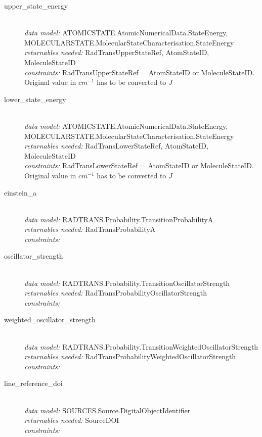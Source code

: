 \documentclass[11pt,a4paper]{ivoa}
\begin{document}
\begin{description}
	\item [upper\_state\_energy]\hfill\\
	\textit{data model:} ATOMICSTATE.AtomicNumericalData.StateEnergy, \\ 
MOLECULARSTATE.MolecularStateCharacterisation.StateEnergy\\
	\textit{returnables needed:} RadTransUpperStateRef, AtomStateID, 
MoleculeStateID\\
	\textit{constraints:} 
 RadTransUpperStateRef = AtomStateID or MoleculeStateID. 
 Original value in $cm^{-1}$ has to be converted to $J$
	
	\item [lower\_state\_energy]\hfill\\
	\textit{data model:} ATOMICSTATE.AtomicNumericalData.StateEnergy, \\ 
MOLECULARSTATE.MolecularStateCharacterisation.StateEnergy\\
	\textit{returnables needed:} RadTransLowerStateRef, AtomStateID,  
MoleculeStateID\\
	\textit{constraints:}  RadTransLowerStateRef = AtomStateID or MoleculeStateID.
	Original value in $cm^{-1}$ has to be converted to $J$

	\item [einstein\_a]\hfill\\
	\textit{data model:}  RADTRANS.Probability.TransitionProbabilityA\\
	\textit{returnables needed:} RadTransProbabilityA\\
	\textit{constraints:}

	\item [oscillator\_strength]\hfill\\
	\textit{data model:}  RADTRANS.Probability.TransitionOscillatorStrength\\
	\textit{returnables needed:} RadTransProbabilityOscillatorStrength\\
        \textit{constraints:}

	\item [weighted\_oscillator\_strength]\hfill\\
	\textit{data model:}  RADTRANS.Probability.TransitionWeightedOscillatorStrength\\
	\textit{returnables needed:} RadTransProbabilityWeightedOscillatorStrength\\
 	   \textit{constraints:}

	\item [line\_reference\_doi]\hfill\\
	\textit{data model:} SOURCES.Source.DigitalObjectIdentifier\\
	\textit{returnables needed:} SourceDOI\\
	\textit{constraints:}


\end{description}
\end{document}
